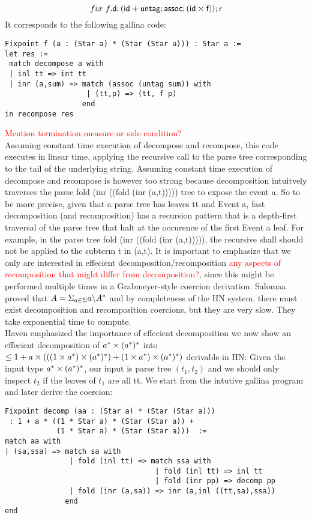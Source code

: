 \documentclass[a4paper,UKenglish,cleveref, autoref, thm-restate]{lipics-v2021}
\newcommand\mycomment[1]{\textcolor{red}{#1}}
\begin{document}
\[ \fix~f. \dslcom{d}; (\dslcom{id} + \dslcom{untag} ; \dslcom{assoc} ; (\dslcom{id} \times \dslcom{f})) ;\dslcom{r} \]
It corresponds to the following gallina code: 
\begin{verbatim}
Fixpoint f (a : (Star a) * (Star (Star a))) : Star a := 
let res := 
 match decompose a with 
 | inl tt => int tt 
 | inr (a,sum) => match (assoc (untag sum)) with 
                   | (tt,p) => (tt, f p)
                  end 
in recompose res
\end{verbatim}
\mycomment{Mention termination measure or side condition?}\\
Assuming constant time execution of \textsf{decompose} and \textsf{recompose}, this code executes in linear time, applying the recursive call to the parse tree corresponding to the tail of the underlying string. Assuming constant time execution of \textsf{decompose} and \textsf{recompose} is however too strong because decomposition intuitvely traverses the parse \textsf{fold (inr ((fold (inr (a,t)))))} tree to expose the event \textsf{a}. So to be more precise, given that a parse tree has leaves \textsf{tt} and \textsf{Event a}, fast decomposition (and recomposition) has a recursion pattern that is a depth-first traversal of the parse tree that halt at the occurence of the first \textsf{Event a} leaf. For example, in the parse tree \textsf{fold (inr ((fold (inr (a,t)))))}, the recursive shall should not be applied to the subterm \textsf{t} in \textsf{(a,t)}. It is important to emphasize that we only are interested in effecient decomposition/recomposition \mycomment{any aspects of recomposition that might differ from decomposition?}, since this might be performed multiple times in a Grabmeyer-style coercion derivation. Salomaa proved that $A = \Sigma_{a \in \Sigma} a \backslash A^*$ and by completeness of the HN system, there must exist decomposition and recomposition coercions, but they are very slow. They take exponential time to compute.\\
Haven emphasized the importance of effecient decomposition we now show an effecient decomposition of $a^*\times ({a^*})^*$ into $\leq 1 + a \times (((1 \times a^*) \times ({a^*})^*) + (1 \times a^*) \times ({a^*})^*)$ derivable in HN: Given the input type $a^*\times ({a^*})^*$, our input is parse tree $(t_1,t_2)$ and we should only inspect $t_2$ if the leaves of $t_1$ are all \textsf{tt}. We start from the intutive gallina program and later derive the coercion:\\
\begin{verbatim}
Fixpoint decomp (aa : (Star a) * (Star (Star a))) 
 : 1 + a * ((1 * Star a) * (Star (Star a)) + 
            (1 * Star a) * (Star (Star a)))  := 
match aa with 
| (sa,ssa) => match sa with 
               | fold (inl tt) => match ssa with 
                                   | fold (inl tt) => inl tt
                                   | fold (inr pp) => decomp pp
               | fold (inr (a,sa)) => inr (a,inl ((tt,sa),ssa))
              end
end
\end{verbatim}
\end{document}

